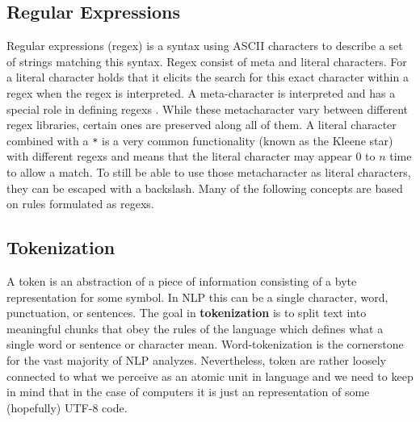 \subsection{Regular Expressions}
Regular expressions (\gls{regex}) is a syntax using ASCII characters to describe a set of strings matching this syntax. Regex consist of meta and literal characters. For a literal character holds that it elicits the search for this exact character within a regex when the regex is interpreted. A meta-character is interpreted and has a special role in defining regexs \citep{Kleene1951}. While these metacharacter vary between different regex libraries, certain ones are preserved along all of them. A literal character combined with a \texttt{*} is a very common functionality (known as the Kleene star) with different regexs and means that the literal character may appear $0$ to $n$ time to allow a match. To still be able to use those metacharacter as literal characters, they can be escaped with a backslash. Many of the following concepts are based on rules formulated as regexs.

\subsection{Tokenization}
A token is an abstraction of a piece of information consisting of a byte representation for some symbol. In NLP this can be a single character, word, punctuation, or sentences. The goal in \textbf{tokenization} is
to split text into meaningful chunks that obey the rules of the language which defines what a single word or sentence or character mean. Word-tokenization is the cornerstone for the vast majority of NLP analyzes.
Nevertheless, token are rather loosely connected to what we perceive as an atomic unit in language and we need to keep in mind that in the case of computers it is just an representation of some (hopefully) UTF-8 code.


